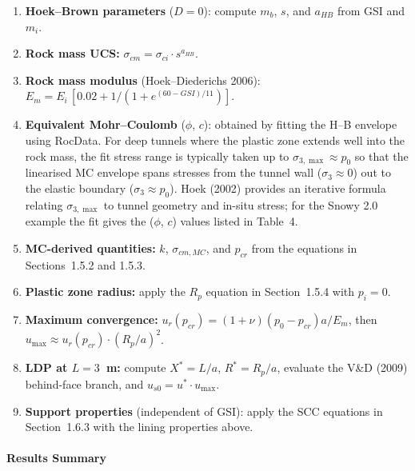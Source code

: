 \begin{enumerate}[leftmargin=*,itemsep=2pt]
 \item \textbf{Hoek--Brown parameters} ($D=0$): compute $m_b$, $s$, and $a_{HB}$ from GSI and $m_i$.
 \item \textbf{Rock mass UCS:} $\sigma_{cm} = \sigma_{ci} \cdot s^{a_{HB}}$.
 \item \textbf{Rock mass modulus} (Hoek--Diederichs 2006): $E_m = E_i \,[0.02 + 1/(1 + e^{(60-GSI)/11})]$.
 \item \textbf{Equivalent Mohr--Coulomb} ($\phi$, $c$): obtained by fitting the H--B envelope using RocData. For deep tunnels where the plastic zone extends well into the rock mass, the fit stress range is typically taken up to $\sigma_{3,\max} \approx p_0$ so that the linearised MC envelope spans stresses from the tunnel wall ($\sigma_3 \approx 0$) out to the elastic boundary ($\sigma_3 \approx p_0$). Hoek (2002) provides an iterative formula relating $\sigma_{3,\max}$ to tunnel geometry and in-situ stress; for the Snowy 2.0 example the fit gives the ($\phi$, $c$) values listed in Table~4.
 \item \textbf{MC-derived quantities:} $k$, $\sigma_{cm,MC}$, and $p_{cr}$ from the equations in Sections~1.5.2 and 1.5.3.
 \item \textbf{Plastic zone radius:} apply the $R_p$ equation in Section~1.5.4 with $p_i = 0$.
 \item \textbf{Maximum convergence:} $u_r(p_{cr}) = (1+\nu)(p_0-p_{cr})a/E_m$, then $u_{\max} \approx u_r(p_{cr}) \cdot (R_p/a)^2$.
 \item \textbf{LDP at $L = 3$~m:} compute $X^* = L/a$, $R^* = R_p/a$, evaluate the V\&D (2009) behind-face branch, and $u_{s0} = u^* \cdot u_{\max}$.
 \item \textbf{Support properties} (independent of GSI): apply the SCC equations in Section~1.6.3 with the lining properties above.
\end{enumerate}

\paragraph{Results Summary}

